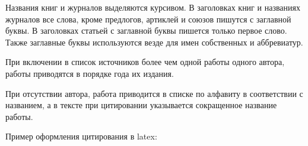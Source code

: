\documentclass[PI]{ProjectProposal}
\begin{document}
Названия книг и журналов выделяются курсивом. В заголовках книг и названиях журналов все слова, кроме предлогов, артиклей и союзов пишутся с заглавной буквы.  В заголовках статьей с заглавной буквы пишется только первое слово. Также заглавные буквы используются везде для имен собственных и аббревиатур.

При включении в список источников более чем одной работы одного автора, работы приводятся в порядке года их издания.

При отсутствии автора, работа приводится в списке по алфавиту в соответствии с названием, а в тексте при цитировании указывается сокращенное название работы.

Пример оформления цитирования в latex:

\nocite{*} %
\putbibliography
\end{document}
